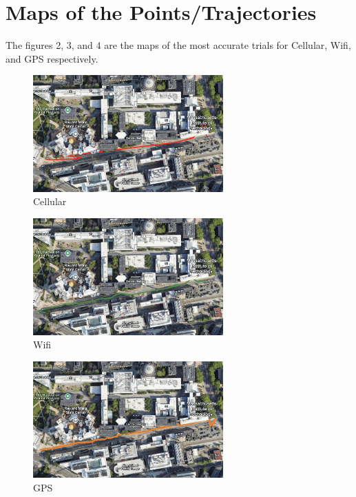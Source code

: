 \documentclass{lab}
\begin{document}
\section{Maps of the Points/Trajectories}

The figures 2, 3, and 4 are the maps of the most accurate trials for Cellular, Wifi, and GPS respectively.

\begin{figure}[h]
\begin{center}
\includegraphics[width=0.65\textwidth]{images/cellular2.png}
\caption{Cellular}
\end{center}
\end{figure}

\begin{figure}[h]
\begin{center}
\includegraphics[width=0.65\textwidth]{images/wifi2.png}
\caption{Wifi}
\end{center}
\end{figure}

\begin{figure}[h]
\begin{center}
\includegraphics[width=0.65\textwidth]{images/gps.png}
\caption{GPS}
\end{center}
\end{figure}
\end{document}
